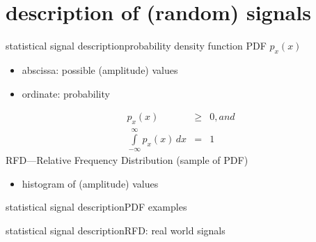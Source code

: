     \section[signal description]{description of (random) signals}
            \begin{frame}{statistical signal description}{probability density function}
                PDF $p_x(x)$
                \begin{itemize}
                    \item	abscissa: possible (amplitude) values
                    \item	ordinate: probability
                \end{itemize}
                \pause
                \begin{eqnarray*}
                    p_x(x)&\geq& 0 , and\\	
                    \int\limits_{-\infty}^{\infty}{p_x(x)\, dx} &=& 1	
                \end{eqnarray*}
                \pause
                RFD---Relative Frequency Distribution (sample of PDF)
                \begin{itemize}
                    \item[] histogram of (amplitude) values
                \end{itemize}
            \end{frame}	
            
            \begin{frame}{statistical signal description}{PDF examples}
            \end{frame}
                
            \begin{frame}{statistical signal description}{RFD: real world signals}
            \end{frame}	
            
